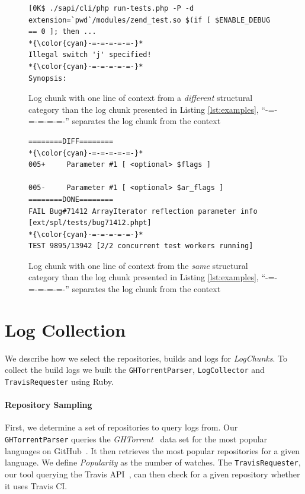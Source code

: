 \documentclass[\myrootdir/main.tex]{subfiles}
\begin{document}
\begin{figure}[]
	\centering
\begin{lstlisting}[breaklines=true]
[0K$ ./sapi/cli/php run-tests.php -P -d extension=`pwd`/modules/zend_test.so $(if [ $ENABLE_DEBUG == 0 ]; then ...
*{\color{cyan}-=-=-=-=-=-}*
Illegal switch 'j' specified!
*{\color{cyan}-=-=-=-=-=-}*
Synopsis:
\end{lstlisting}
	
	\caption{Log chunk with one line of context from a \emph{different} structural category than the log chunk presented in Listing \ref{lst:examples}, ``{\color{cyan}-=-=-=-=-=-}'' separates the log chunk from the context}
	\label{lst:same-category}
\end{figure}

\begin{figure}[]
	\centering
\begin{lstlisting}[breaklines=true]
========DIFF========
*{\color{cyan}-=-=-=-=-=-}*
005+     Parameter #1 [ <optional> $flags ]

005-     Parameter #1 [ <optional> $ar_flags ]
========DONE========
FAIL Bug#71412 ArrayIterator reflection parameter info [ext/spl/tests/bug71412.phpt] 
*{\color{cyan}-=-=-=-=-=-}*
TEST 9895/13942 [2/2 concurrent test workers running]
\end{lstlisting}
	
	\caption{Log chunk with one line of context from the \emph{same} structural category than the log chunk presented in Listing \ref{lst:examples}, ``{\color{cyan}-=-=-=-=-=-}'' separates the log chunk from the context}
	\label{lst:different-category}
\end{figure}

\section{Log Collection}
We describe how we select the repositories, builds and logs for \emph{LogChunks}.
To collect the build logs we built the  \texttt{GHTorrentParser}, \texttt{LogCollector} and \texttt{TravisRequester} using Ruby.

\paragraph{Repository Sampling}
First, we determine a set of repositories to query logs from.
Our \texttt{GHTorrentParser} queries the \emph{GHTorrent}~\cite{gousios2013ghtorrent} data set for the most popular languages on GitHub~\cite{github2019website}.
It then retrieves the most popular repositories for a given language.
We define \emph{Popularity} as the number of watches.
The \texttt{TravisRequester}, our tool querying the Travis API~\cite{travisci2019apidoc}, can then check for a given repository whether it uses Travis CI\@.
\end{document}

